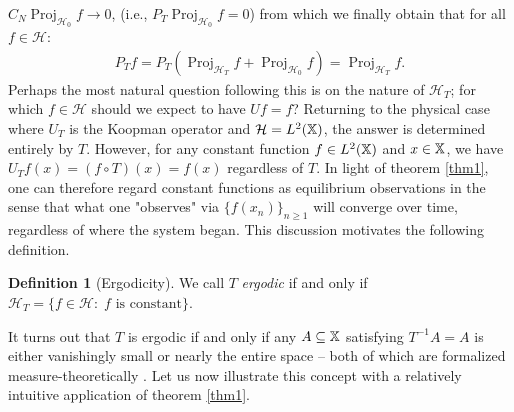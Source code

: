\documentclass[11pt]{report}
\newcommand{\mc}[1]{\mathcal{#1}}
\newcommand{\1}[1]{\mathbbm{1}_{\{#1\}}}
\DeclareMathOperator{\proj}{Proj}
\theoremstyle{definition}
\newtheorem{definition}{Definition}
\begin{document}
    $C_N\proj_{\mc{H}_0}f\rightarrow 0$, (i.e., $P_T\proj_{\mc{H}_0}f=0$) from
    which we finally obtain that for all $f\in\mc{H}$:
    \begin{align*}
        P_Tf=P_T(\proj_{\mc{H}_T}f+\proj_{\mc{H}_0}f)=\proj_{\mc{H}_T}f.\tag*{$\qed$}
    \end{align*}
    \indent Perhaps the most natural question following this is on the nature of
    $\mc{H}_T$; for which $f\in\mc{H}$ should we expect to have $Uf=f$? Returning to the
    physical case where $U_T$ is the Koopman operator and $\mc{H}=L^2(\mbb{X})$,
    the answer is determined entirely by $T$. However, for any constant function
    $f\in L^2(\mathbb{X})$ and $x\in\mathbb{X}$, we have $U_Tf(x)=(f\circ T)(x)=f(x)$
    regardless of $T$. In light of theorem \ref{thm1}, one can therefore regard
    constant functions as equilibrium observations in the sense that what one
    "observes" via $\{f(x_n)\}_{n\geq 1}$ will converge over time, regardless of
    where the system began. This discussion motivates the following definition.
    \begin{definition}[Ergodicity]\label{def2} We call $T$ \textit{ergodic} if
        and only if $\mc{H}_T=\{f\in\mc{H}:\;\text{$f$ is constant}\}$.
    \end{definition}
    It turns out that $T$ is ergodic if and only if any $A\subseteq\mathbb{X}$
    satisfying $T^{-1}A=A$ is either vanishingly small or nearly the entire
    space -- both of which are formalized measure-theoretically \cite[$\S$II.5,
    p.59]{Reed_Simon_1972}. Let us now illustrate this concept with a relatively
    intuitive application of theorem \ref{thm1}.
\end{document}
